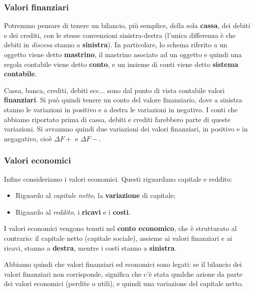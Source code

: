 \documentclass[a4paper,11pt]{article}
\begin{document}
\subsubsection{Valori finanziari}
Potremmo pensare di tenere un bilancio, più semplice, della sola \textbf{cassa}, dei debiti e dei crediti, con le stesse convenzioni sinistra-destra (l'unica differenza è che debiti in \textit{discesa} stanno a \textbf{sinistra}).
In particolare, lo schema riferito a un oggetto viene detto \textbf{mastrino}, il mastrino asociato ad un oggetto e quindi una regola contabile viene detto \textbf{conto}, e un insieme di conti viene detto \textbf{sistema contabile}.

Cassa, banca, crediti, debiti ecc... sono dal punto di vista contabile valori \textbf{finanziari}.
Si può quindi tenere un conto del valore finanziario, dove a sinistra stanno le variazioni in positivo e a destra le variazioni in negativo.
I conti che abbiamo riportato prima di cassa, debiti e crediti farebbero parte di queste variazioni.
Si avrannno quindi due variazioni dei valori finanziari, in positivo e in negagativo, cioè $\Delta F+$ e $\Delta F-$.

\subsubsection{Valori economici}
Infine consideriamo i valori economici.
Questi riguardano capitale e reddito:
\begin{itemize}
	\item Riguardo al \textit{capitale netto}, la \textbf{variazione} di capitale;
	\item Riguardo al \textit{reddito}, i \textbf{ricavi} e i \textbf{costi}.
\end{itemize}

I valori economici vengono tenuti nel \textbf{conto economico}, che è strutturato al contrario: il capitale netto (capitale sociale), assieme ai valori finanziari e ai ricavi, stanno a \textbf{destra}, mentre i costi stanno a \textbf{sinistra}.

\par\medskip

Abbiamo quindi che valori finanziari ed economici sono legati: se il bilancio dei valori finanziari non corrisponde, significa che c'è stata qualche azione da parte dei valori economici (perdite o utili), e quindi una variazione del capitale netto.
\end{document}
